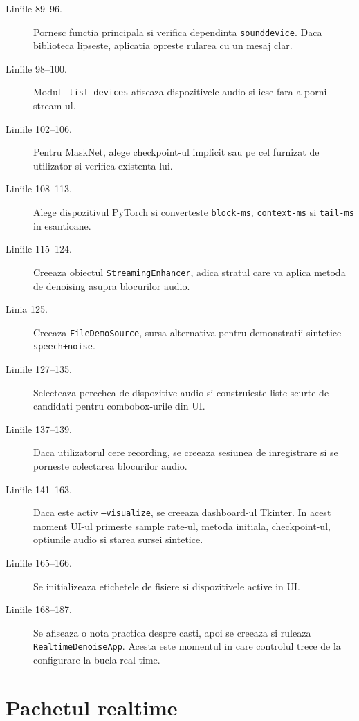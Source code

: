 \documentclass[12pt,a4paper]{report}
\newcommand{\filetitle}[1]{\section*{\texttt{\detokenize{#1}}}}
\begin{document}
\begin{description}
    \item[Liniile 89--96.] Pornesc functia principala si verifica dependinta
    \texttt{sounddevice}. Daca biblioteca lipseste, aplicatia opreste rularea cu
    un mesaj clar.
    \item[Liniile 98--100.] Modul \texttt{--list-devices} afiseaza dispozitivele
    audio si iese fara a porni stream-ul.
    \item[Liniile 102--106.] Pentru MaskNet, alege checkpoint-ul implicit sau pe
    cel furnizat de utilizator si verifica existenta lui.
    \item[Liniile 108--113.] Alege dispozitivul PyTorch si converteste
    \texttt{block-ms}, \texttt{context-ms} si \texttt{tail-ms} in esantioane.
    \item[Liniile 115--124.] Creeaza obiectul \texttt{StreamingEnhancer}, adica
    stratul care va aplica metoda de denoising asupra blocurilor audio.
    \item[Linia 125.] Creeaza \texttt{FileDemoSource}, sursa alternativa pentru
    demonstratii sintetice \texttt{speech+noise}.
    \item[Liniile 127--135.] Selecteaza perechea de dispozitive audio si construieste
    liste scurte de candidati pentru combobox-urile din UI.
    \item[Liniile 137--139.] Daca utilizatorul cere recording, se creeaza sesiunea
    de inregistrare si se porneste colectarea blocurilor audio.
    \item[Liniile 141--163.] Daca este activ \texttt{--visualize}, se creeaza
    dashboard-ul Tkinter. In acest moment UI-ul primeste sample rate-ul, metoda
    initiala, checkpoint-ul, optiunile audio si starea sursei sintetice.
    \item[Liniile 165--166.] Se initializeaza etichetele de fisiere si dispozitivele
    active in UI.
    \item[Liniile 168--187.] Se afiseaza o nota practica despre casti, apoi se
    creeaza si ruleaza \texttt{RealtimeDenoiseApp}. Acesta este momentul in care
    controlul trece de la configurare la bucla real-time.
\end{description}

\chapter{Pachetul realtime}

\filetitle{src/tools/realtime/__init__.py}
\end{document}
